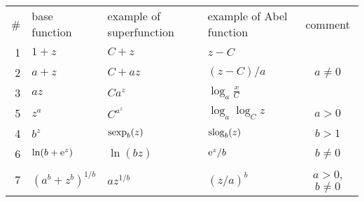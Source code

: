 \begin{table}
\begin{center}
\title{}

\begin{tabular}{r|l|l|l|c}
\#   &base function & example of superfunction & example of Abel function  &comment\\
%
%
 1&$1+z		$&$C + z				$&$z-C	$&$		$\\
 2&$a+z			$&$C + a z				$&$(z-C)/a			$&$a\!\ne\!0 $\\
 3&$a z		$&$C a^z $&$\log_a \frac xC $&$ $\\ 
5&$z^a 			$&$C^{a^z}		$&$\log_{a} \log_C z	$&$a>0		$\\ 
4&$b^z 			$&${\rm sexp}_b(z)		$&${\rm slog}_b(z)	$&$b\!>\!1$ \\
6&$\ln(b+\mathrm{e}^z)	$&$\ln(bz)		$&$\mathrm{e}^z/b	$&$b\ne 0$ \\
7&$(a^b\!+\!z^b)^{1/b}	$&$az^{1/b}		$&$(z/a)^b	$&$a\!>\!0$, $b\!\ne\!0	$ \\

\end{tabular}
\end{center}
\end{table}
